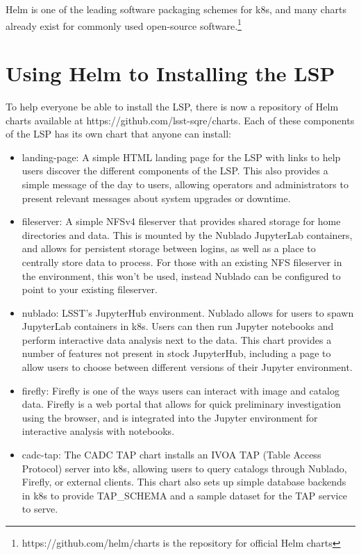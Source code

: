 \documentclass[11pt,twoside]{article}
\begin{document}
Helm is one of the leading software packaging schemes for k8s, and many charts
already exist for commonly used open-source software.\footnote{https://github.com/helm/charts
is the repository for official Helm charts}

\section{Using Helm to Installing the LSP}

To help everyone be able to install the LSP, there is now a repository of Helm
charts available at https://github.com/lsst-sqre/charts.  Each of these components
of the LSP has its own chart that anyone can install:

\begin{itemize}

\item landing-page: A simple HTML landing page for the LSP with links to help users
discover the different components of the LSP.  This also provides a simple message of
the day to users, allowing operators and administrators to present relevant
messages about system upgrades or downtime.

\item fileserver: A simple NFSv4 fileserver that provides shared storage for
home directories and data.  This is mounted by the Nublado JupyterLab containers,
and allows for persistent storage between logins, as well as a place to centrally
store data to process.  For those with an existing NFS fileserver in the environment,
this won't be used, instead Nublado can be configured to point to your existing
fileserver.

\item nublado: LSST's JupyterHub environment.  Nublado allows for users to spawn
JupyterLab containers in k8s.  Users can then run Jupyter notebooks and perform interactive
data analysis next to the data.  This chart provides a number of features not present
in stock JupyterHub, including a page to allow users to choose between different versions
of their Jupyter environment.

\item firefly: Firefly is one of the ways users can interact with image and catalog
data.  Firefly is a web portal that allows for quick preliminary
investigation using the browser, and is integrated into the Jupyter
environment for interactive analysis with notebooks.

\item cadc-tap: The CADC TAP chart installs an IVOA TAP (Table Access Protocol)
server into k8s, allowing users to query catalogs through Nublado, Firefly,
or external clients.  This chart also sets up simple database backends
in k8s to provide TAP\_SCHEMA and a sample dataset for the TAP service to serve.

\end{itemize}
\end{document}
